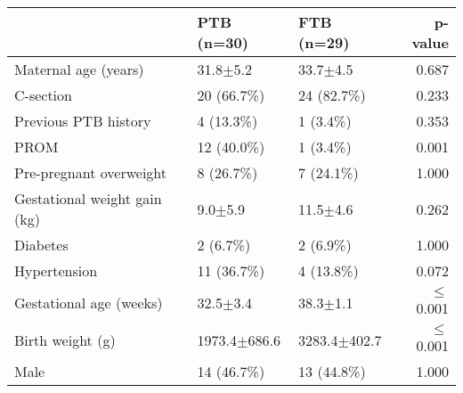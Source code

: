 \begin{tabular}{l|llr}
 & PTB (n=30) & FTB (n=29) & p-value \\ \hline
Maternal age (years) & 31.8$\pm$5.2 & 33.7$\pm$4.5 & 0.687 \\
C-section & 20 (66.7\%) & 24 (82.7\%) & 0.233 \\
Previous PTB history & 4 (13.3\%) & 1 (3.4\%) & 0.353 \\
PROM & 12 (40.0\%) & 1 (3.4\%) & 0.001 \\
Pre-pregnant overweight & 8 (26.7\%) & 7 (24.1\%) & 1.000 \\
Gestational weight gain (kg) & 9.0$\pm$5.9 & 11.5$\pm$4.6 & 0.262 \\
Diabetes & 2 (6.7\%) & 2 (6.9\%) & 1.000 \\
Hypertension & 11 (36.7\%) & 4 (13.8\%) & 0.072 \\
Gestational age (weeks) & 32.5$\pm$3.4 & 38.3$\pm$1.1 & $\le$0.001 \\
Birth weight (g) & 1973.4$\pm$686.6 & 3283.4$\pm$402.7 & $\le$0.001 \\
Male & 14 (46.7\%) & 13 (44.8\%) & 1.000
\end{tabular}

